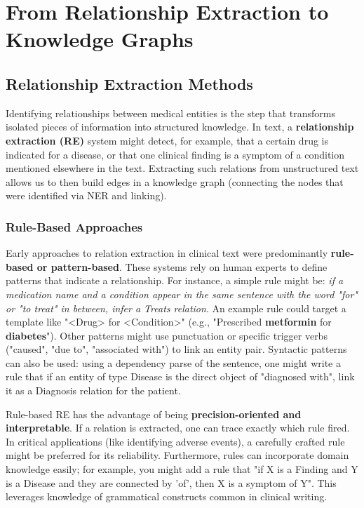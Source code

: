 \section{From Relationship Extraction to Knowledge Graphs}

\subsection{Relationship Extraction Methods}

Identifying relationships between medical entities is the step that transforms isolated pieces of information into structured knowledge. In text, a \textbf{relationship extraction (RE)} system might detect, for example, that a certain drug is indicated for a disease, or that one clinical finding is a symptom of a condition mentioned elsewhere in the text. Extracting such relations from unstructured text allows us to then build edges in a knowledge graph (connecting the nodes that were identified via NER and linking).

\subsubsection{Rule-Based Approaches}

Early approaches to relation extraction in clinical text were predominantly \textbf{rule-based or pattern-based}. These systems rely on human experts to define patterns that indicate a relationship. For instance, a simple rule might be: \emph{if a medication name and a condition appear in the same sentence with the word "for" or "to treat" in between, infer a Treats relation}. An example rule could target a template like "<Drug> for <Condition>" (e.g., "Prescribed \textbf{metformin} for \textbf{diabetes}"). Other patterns might use punctuation or specific trigger verbs ("caused", "due to", "associated with") to link an entity pair. Syntactic patterns can also be used: using a dependency parse of the sentence, one might write a rule that if an entity of type Disease is the direct object of "diagnosed with", link it as a Diagnosis relation for the patient.

Rule-based RE has the advantage of being \textbf{precision-oriented and interpretable}. If a relation is extracted, one can trace exactly which rule fired. In critical applications (like identifying adverse events), a carefully crafted rule might be preferred for its reliability. Furthermore, rules can incorporate domain knowledge easily; for example, you might add a rule that "if X is a Finding and Y is a Disease and they are connected by 'of', then X is a symptom of Y". This leverages knowledge of grammatical constructs common in clinical writing.

